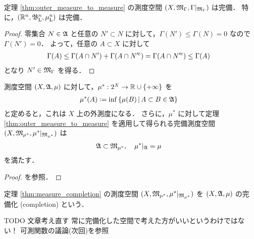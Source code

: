 \begin{proposition}
    定理 \ref{thm:outer_measure_to_measure} の測度空間 $(X,\mathfrak{M}_\Gamma,\Gamma\vert_{\mathfrak{M}_\Gamma})$ は完備．
    特に，$(\mathbb{R}^n,\mathfrak{B}_{\mathrm{L}}^n,\mu_{\mathrm{L}}^n)$ は完備．
\end{proposition}

\begin{proof}
    零集合 $N\in\mathfrak{A}$ と任意の $N'\subset N$ に対して，$\Gamma(N')\le\Gamma(N)=0$ なので $\Gamma(N')=0$．
    よって，任意の $A\subset X$ に対して
    \begin{align*}
        \Gamma(A)
        \le\Gamma(A\cap N')+\Gamma(A\cap N'^{\mathrm{c}})
        =\Gamma(A\cap N'^{\mathrm{c}})
        \le\Gamma(A)
    \end{align*}
    となり $N'\in\mathfrak{M}_\Gamma$ を得る．
\end{proof}

\begin{theorem}\label{thm:measure_completion}
    測度空間 $(X,\mathfrak{A},\mu)$ に対して，$\mu^\ast:2^X\to\mathbb{R}\cup\{+\infty\}$ を
    \begin{align*}
        \mu^\ast(A)\defeq\inf\left\{
            \mu(B)\,\middle\vert\,A\subset B\in\Afrak
        \right\}
    \end{align*}
    と定めると，これは $X$ 上の外測度になる．
    さらに，$\mu^\ast$ に対して定理 \ref{thm:outer_measure_to_measure} を適用して得られる完備測度空間
    $(X,\mathfrak{M}_{\mu^*},\mu^\ast\vert_{\mathfrak{M}_{\mu^\ast}})$ は
    \begin{align*}
        \mathfrak{A}\subset\mathfrak{M}_{\mu^*},\quad
        \mu^\ast\vert_{\mathfrak{A}}=\mu
    \end{align*}
    を満たす．
\end{theorem}

\begin{proof}
    \cite[定理 8.4]{It63} を参照．
\end{proof}

\begin{definition}
    定理 \ref{thm:measure_completion} の測度空間 $(X,\mathfrak{M}_{\mu^*},\mu^\ast\vert_{\mathfrak{M}_{\mu^\ast}})$ を
    $(X,\mathfrak{A},\mu)$ の完備化 (completion) という．
\end{definition}

{\color{red} TODO 文章考え直す}
常に完備化した空間で考えた方がいいというわけではない！ 
可測関数の議論(次回)を参照

